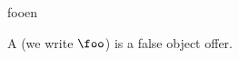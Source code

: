 \begin{modnl}[creators=miko]{foo}{en}
\begin{definition}[id=foo.def]
  A  (we write $\foo$) is a false object offer. 
\end{definition}
\end{modnl}

